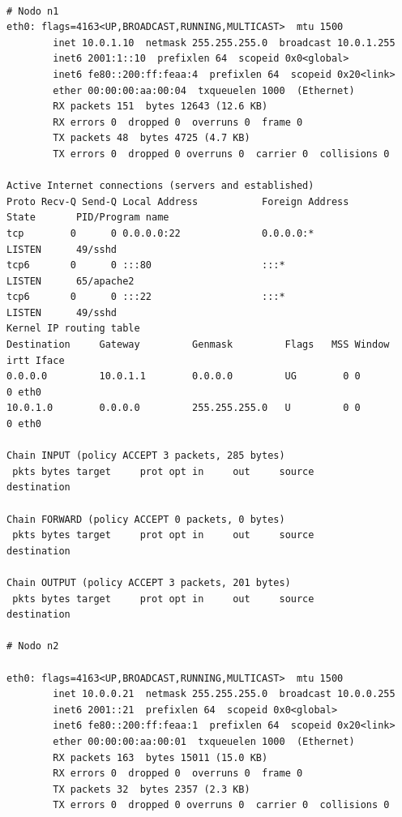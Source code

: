 \begingroup
    \fontsize{9pt}{10pt}\selectfont
\begin{lstlisting}

# Nodo n1
eth0: flags=4163<UP,BROADCAST,RUNNING,MULTICAST>  mtu 1500
        inet 10.0.1.10  netmask 255.255.255.0  broadcast 10.0.1.255
        inet6 2001:1::10  prefixlen 64  scopeid 0x0<global>
        inet6 fe80::200:ff:feaa:4  prefixlen 64  scopeid 0x20<link>
        ether 00:00:00:aa:00:04  txqueuelen 1000  (Ethernet)
        RX packets 151  bytes 12643 (12.6 KB)
        RX errors 0  dropped 0  overruns 0  frame 0
        TX packets 48  bytes 4725 (4.7 KB)
        TX errors 0  dropped 0 overruns 0  carrier 0  collisions 0

Active Internet connections (servers and established)
Proto Recv-Q Send-Q Local Address           Foreign Address         State       PID/Program name    
tcp        0      0 0.0.0.0:22              0.0.0.0:*               LISTEN      49/sshd             
tcp6       0      0 :::80                   :::*                    LISTEN      65/apache2          
tcp6       0      0 :::22                   :::*                    LISTEN      49/sshd        
Kernel IP routing table
Destination     Gateway         Genmask         Flags   MSS Window  irtt Iface
0.0.0.0         10.0.1.1        0.0.0.0         UG        0 0          0 eth0
10.0.1.0        0.0.0.0         255.255.255.0   U         0 0          0 eth0

Chain INPUT (policy ACCEPT 3 packets, 285 bytes)
 pkts bytes target     prot opt in     out     source               destination         

Chain FORWARD (policy ACCEPT 0 packets, 0 bytes)
 pkts bytes target     prot opt in     out     source               destination         

Chain OUTPUT (policy ACCEPT 3 packets, 201 bytes)
 pkts bytes target     prot opt in     out     source               destination       

# Nodo n2

eth0: flags=4163<UP,BROADCAST,RUNNING,MULTICAST>  mtu 1500
        inet 10.0.0.21  netmask 255.255.255.0  broadcast 10.0.0.255
        inet6 2001::21  prefixlen 64  scopeid 0x0<global>
        inet6 fe80::200:ff:feaa:1  prefixlen 64  scopeid 0x20<link>
        ether 00:00:00:aa:00:01  txqueuelen 1000  (Ethernet)
        RX packets 163  bytes 15011 (15.0 KB)
        RX errors 0  dropped 0  overruns 0  frame 0
        TX packets 32  bytes 2357 (2.3 KB)
        TX errors 0  dropped 0 overruns 0  carrier 0  collisions 0


\end{lstlisting}
